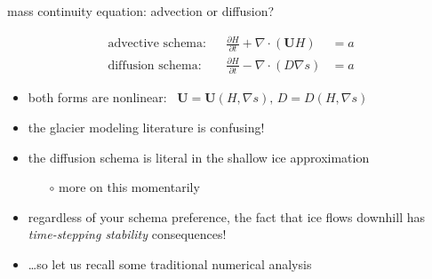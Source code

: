 \documentclass[svgnames,
               hyperref={colorlinks,citecolor=DeepPink4,linkcolor=FireBrick,urlcolor=Maroon},
               usepdftitle=false]  %
               {beamer}
\newcommand{\grad}{\nabla}
\newcommand{\bU}{\mathbf{U}}
\begin{document}
\begin{frame}{mass continuity equation: advection or diffusion?}

\begin{align*}
\text{advective schema:} && \frac{\partial H}{\partial t} + \nabla \cdot \left(\bU H\right) &= a \\
\text{diffusion schema:} && \frac{\partial H}{\partial t} - \nabla \cdot \left(D \grad s\right) &= a
\end{align*}
\begin{itemize}
\item both forms are nonlinear: \, $\bU=\bU(H,\grad s), \, D=D(H,\grad s)$
\item the glacier modeling literature is confusing!
\item the diffusion schema is literal in the shallow ice approximation
    \begin{itemize}
    \item[$\circ$] more on this momentarily
    \end{itemize}
\item regardless of your schema preference, the fact that ice flows downhill has \emph{time-stepping stability} consequences!
\item \dots so let us recall some traditional numerical analysis
\end{itemize}
\end{frame}
\end{document}
